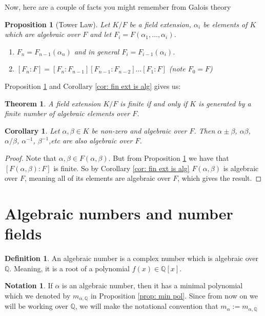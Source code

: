 \documentclass[11pt,a4paper]{report}
\theoremstyle{plain}
\newtheorem{thm}[subsection]{Theorem}
\newtheorem{cor}[subsection]{Corollary}
\newtheorem{prop}[subsection]{Proposition}
\theoremstyle{definition}
\newtheorem{definition}[subsection]{Definition}
\theoremstyle{definition}
\newtheorem{nota}[subsection]{Notation}
\def\QQ{\mathbb{Q}}
\def \a{\alpha}
\begin{document}
	Now, here are a couple of facts you might remember from Galois theory
	
	\begin{prop}[Tower Law]\label{prop: tower law}Let $K/F$ be a field extension, $\a_i$ be elements of $K$ which are algebraic over $F$ and let $F_i=F(\a_1,\dots,\a_i)$.
		\begin{enumerate}
			\item $F_n=F_{n-1}(\a_n)$ and in general $F_i=F_{i-1}(\a_i)$.
			\item  $[F_n:F]=[F_n:F_{n-1}][F_{n-1}:F_{n-2}]\dots[F_1:F]$ (note $F_0=F$)
		\end{enumerate}
	\end{prop}
	
	Proposition \ref{prop: tower law} and Corollary \ref{cor: fin ext is alg} gives us:
	
	\begin{thm}\label{thm: fin ext iff alg}
		A field extension $K/F$ is finite if and only if $K$ is generated by a finite number of algebraic elements over $F$.
	\end{thm}
	
	\begin{cor}
		Let $\a,\beta \in K$ be non-zero and algebraic over $F$. Then $\a \pm \beta$, $\a\beta$, $\a/\beta$, $\a^{-1}$, $\beta^{-1}$,etc are also algebraic over $F$.
	\end{cor}
	\begin{proof}
		Note that $\a, \beta \in F(\a,\beta)$. But from Proposition \ref{prop: tower law} we have  that $[F(\a,\beta):F]$ is finite. So by Corollary \ref{cor: fin ext is alg} $F(\a,\beta)$ is algebraic over $F$, meaning all of its elements are algebraic over $F$, which gives the result.
	\end{proof}
	
	\section{Algebraic numbers and number fields}
	
	\begin{definition}
		An algebraic number is a complex number which is algebraic over $\QQ$. Meaning, it is a root of a polynomial $f(x) \in \QQ[x]$.
	\end{definition}
	
	\begin{nota}
		If $\a$ is an algebraic number, then it has a minimal polynomial which we denoted by $m_{\a,\QQ}$ in Proposition \ref{prop: min pol}. Since from now on we will be working over $\QQ$, we will make the notational convention that $m_{\a}:=m_{\a,\QQ}$
	\end{nota}
	
\end{document}
